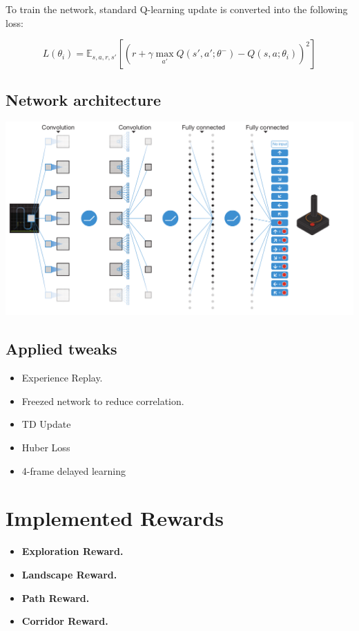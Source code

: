 \documentclass{article}
\begin{document}
To train the network, standard Q-learning update is converted into the
following loss:

$$L(\theta_i) = \mathbb{E}_{s,a,r,s'} \left[ \left(r + \gamma \max_{a'}Q(s', a'; \theta^{-}) - Q(s, a; \theta_i) \right)^2 \right] $$

\subsection{Network architecture}

\includegraphics[scale=0.3]{dqn_crop.png}

\subsection{Applied tweaks}

\begin{itemize}
    \item Experience Replay.
    \item Freezed network to reduce correlation.
    \item TD Update 
    \item Huber Loss
    \item 4-frame delayed learning
\end{itemize}

\section{Implemented Rewards}

\begin{itemize}
    \item {\bf Exploration Reward.}
    \item {\bf Landscape Reward.}
    \item {\bf Path Reward.}
    \item {\bf Corridor Reward.}
\end{itemize}
\end{document}
